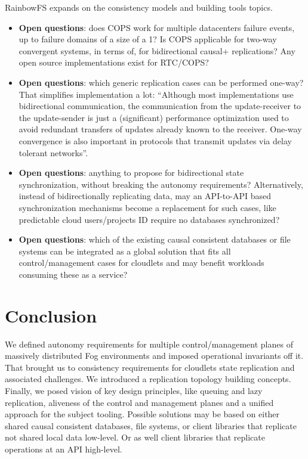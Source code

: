 \documentclass[conference]{IEEEtran}
\begin{document}
RainbowFS\cite{b7} expands on the consistency models and building tools topics.
\begin{itemize}
  \item \textbf{Open questions}: does COPS work for multiple datacenters
    failure events, up to failure domains of a size of a 1? Is COPS applicable
    for two-way convergent systems, in terms of\cite{b2}, for bidirectional
    causal+ replications? Any open source implementations exist for RTC/COPS?
  \item \textbf{Open questions}: which generic replication cases can be
    performed one-way? That simplifies implementation a lot: ``Although most
    implementations use bidirectional communication, the communication from the
    update-receiver to the update-sender is just a (significant) performance
    optimization used to avoid redundant transfers of updates already known to
    the receiver. One-way convergence is also important in protocols that
    transmit updates via delay tolerant networks''\cite{b2}.
  \item \textbf{Open questions}: anything to propose for bidirectional state
    synchronization, without breaking the autonomy requirements? Alternatively,
    instead of bidirectionally replicating data, may an API-to-API based
    synchronization mechanisms become a replacement for such cases, like
    predictable cloud users/projects ID require no databases synchronized?
  \item \textbf{Open questions}: which of the existing causal consistent
    databases\cite{b6} or file systems\cite{b7} can be integrated as a global
    solution that fits all control/management cases for cloudlets and may
    benefit workloads consuming these as a service?
\end{itemize}

\section{Conclusion}
We defined autonomy requirements for multiple control/management planes of
massively distributed Fog environments and imposed operational invariants off
it. That brought us to consistency requirements for cloudlets state replication
and associated challenges. We introduced a replication topology building
concepts. Finally, we posed vision of key design principles, like queuing and
lazy replication, aliveness of the control and management planes and a unified
approach for the subject tooling. Possible solutions may be based on either
shared causal consistent databases, file systems, or client libraries that
replicate not shared local data low-level. Or as well client libraries that
replicate operations at an API high-level.
\end{document}
